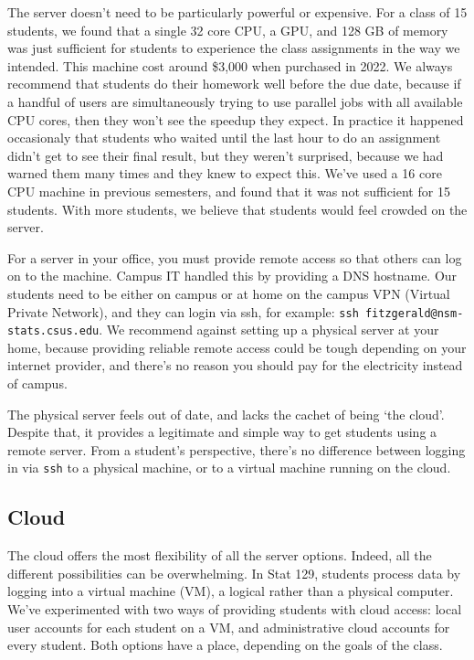 \documentclass[12pt]{article}
\begin{document}
The server doesn't need to be particularly powerful or expensive.
For a class of 15 students, we found that a single 32 core CPU, a GPU, and 128 GB of memory was just sufficient for students to experience the class assignments in the way we intended.
This machine cost around \$3,000 when purchased in 2022.
We always recommend that students do their homework well before the due date, because if a handful of users are simultaneously trying to use parallel jobs with all available CPU cores, then they won't see the speedup they expect.
In practice it happened occasionaly that students who waited until the last hour to do an assignment didn't get to see their final result, but they weren't surprised, because we had warned them many times and they knew to expect this.
We've used a 16 core CPU machine in previous semesters, and found that it was not sufficient for 15 students.
With more students, we believe that students would feel crowded on the server.

For a server in your office, you must provide remote access so that others can log on to the machine.
Campus IT handled this by providing a DNS hostname.
Our students need to be either on campus or at home on the campus VPN (Virtual Private Network), and they can login via ssh, for example: \texttt{ssh fitzgerald@nsm-stats.csus.edu}.
We recommend against setting up a physical server at your home, because providing reliable remote access could be tough depending on your internet provider, and there's no reason you should pay for the electricity instead of campus.

The physical server feels out of date, and lacks the cachet of being `the cloud'.
Despite that, it provides a legitimate and simple way to get students using a remote server.
From a student's perspective, there's no difference between logging in via \texttt{ssh} to a physical machine, or to a virtual machine running on the cloud.

\subsection{Cloud}

The cloud offers the most flexibility of all the server options.
Indeed, all the different possibilities can be overwhelming.
In Stat 129, students process data by logging into a virtual machine (VM), a logical rather than a physical computer.
We've experimented with two ways of providing students with cloud access: local user accounts for each student on a VM, and administrative cloud accounts for every student.
Both options have a place, depending on the goals of the class.
\end{document}
